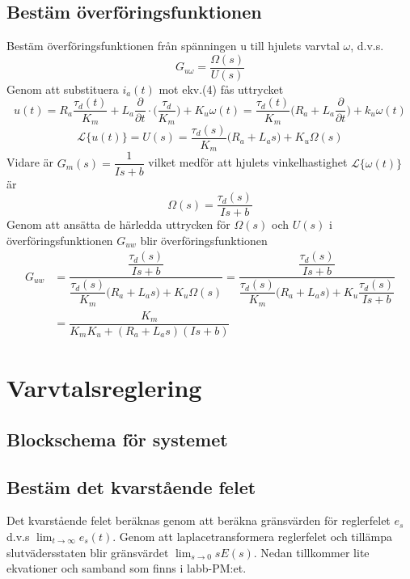 \documentclass[11pt]{article}
\begin{document}
\subsection{Bestäm överföringsfunktionen}
Bestäm överföringsfunktionen från spänningen u till hjulets varvtal $\omega$, d.v.s.
$$
G_{u\omega}=\dfrac{\Omega(s)}{U(s)}
$$
Genom att substituera $i_a(t)$ mot ekv.(4) fås uttrycket
\begin{equation*}
u(t)=R_a\dfrac{\tau_d(t)}{K_m}+L_a\dfrac{\partial}{\partial t}\cdot\Big( \dfrac{\tau_d}{K_m}\Big)+K_u\omega(t) = \dfrac{\tau_d(t)}{K_m}\Big(R_a+L_a\dfrac{\partial}{\partial t}\Big)+k_u\omega(t)
\end{equation*}
\begin{equation*}
\mathcal{L}\{u(t)\} =U(s)= \dfrac{\tau_d(s)}{K_m}\Big(R_a+L_as\Big)+K_u\Omega(s)
\end{equation*}\newpage
Vidare är $G_m(s)=\dfrac{1}{Is+b}$ vilket medför att hjulets vinkelhastighet $\mathcal{L}\{\omega(t)\}$ är
\begin{equation*}
\Omega(s)=\dfrac{\tau_d(s)}{Is+b}
\end{equation*}
Genom att ansätta de härledda uttrycken för $\Omega(s)$ och $U(s)$ i överföringsfunktionen $G_{uw}$ blir överföringsfunktionen
\begin{equation*}
\begin{split}
G_{uw} &= \dfrac{\dfrac{\tau_d(s)}{Is+b}}{\dfrac{\tau_d(s)}{K_m}\Big(R_a+L_as\Big)+K_u\Omega(s)} = \dfrac{\dfrac{\tau_d(s)}{Is+b}}{\dfrac{\tau_d(s)}{K_m}\Big(R_a+L_as\Big)+K_u\dfrac{\tau_d(s)}{Is+b}}\\
&=\dfrac{K_m}{K_mK_u+(R_a+L_as)(Is+b)}
\end{split}
\end{equation*}
\section{Varvtalsreglering}
\subsection{Blockschema för systemet}
\subsection{Bestäm det kvarstående felet}
Det kvarstående felet beräknas genom att beräkna gränsvärden för reglerfelet $e_s$ d.v.s $\lim_{t \to \infty} e_s(t)$. Genom att laplacetransformera reglerfelet och tillämpa slutvädersstaten blir gränsvärdet $\lim_{s \to 0}sE(s)$. Nedan tillkommer lite ekvationer och samband som finns i labb-PM:et. 
\end{document}
